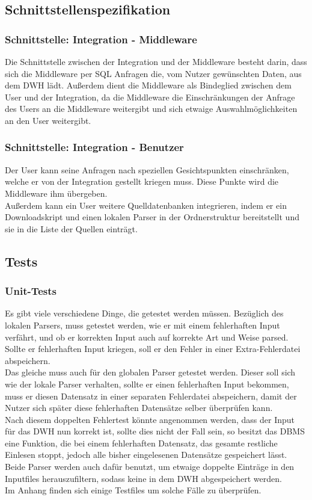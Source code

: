 \subsection{Schnittstellenspezifikation}
\subsubsection{Schnittstelle: Integration - Middleware}
Die Schnittstelle zwischen der Integration und der Middleware besteht darin, dass sich die Middleware per SQL Anfragen die, vom Nutzer gewünschten Daten, aus dem DWH lädt. Außerdem dient die Middleware als Bindeglied zwischen dem User und der Integration, da die Middleware die Einschränkungen der Anfrage des Users an die Middleware weitergibt und sich etwaige Auswahlmöglichkeiten an den User weitergibt.
\subsubsection{Schnittstelle: Integration - Benutzer}
Der User kann seine Anfragen nach speziellen Gesichtspunkten einschränken, welche er von der Integration gestellt kriegen muss. Diese Punkte wird die Middleware ihm übergeben.\\
Außerdem kann ein User weitere Quelldatenbanken integrieren, indem er ein Downloadskript und einen lokalen Parser in der Ordnerstruktur bereitstellt und sie in die Liste der Quellen einträgt.\\
\subsection{Tests}
\subsubsection{Unit-Tests}
Es gibt viele verschiedene Dinge, die getestet werden müssen. Bezüglich des lokalen Parsers, muss getestet werden, wie er  mit einem fehlerhaften Input verfährt, und ob er korrekten Input auch auf korrekte Art und Weise parsed. Sollte er fehlerhaften Input kriegen, soll er den Fehler in einer Extra-Fehlerdatei abspeichern.\\
Das gleiche muss auch für den globalen Parser getestet werden. Dieser soll sich wie der lokale Parser verhalten, sollte er einen fehlerhaften Input bekommen, muss er diesen Datensatz in einer separaten Fehlerdatei abspeichern, damit der Nutzer sich später diese fehlerhaften Datensätze selber überprüfen kann.\\
Nach diesem doppelten Fehlertest könnte angenommen werden, dass der Input für das DWH nun korrekt ist, sollte dies nicht der Fall sein, so besitzt das DBMS eine Funktion, die bei einem fehlerhaften Datensatz, das gesamte restliche Einlesen stoppt, jedoch alle bisher eingelesenen Datensätze gespeichert lässt.\\
Beide Parser werden auch dafür benutzt, um etwaige doppelte Einträge in den Inputfiles herauszufiltern, sodass keine in dem DWH abgespeichert werden.\\
Im Anhang finden sich einige Testfiles um solche Fälle zu überprüfen.
